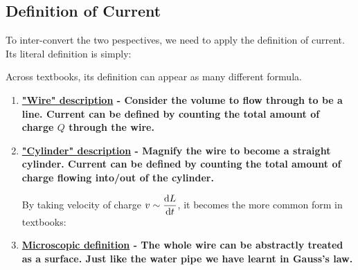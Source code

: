 \documentclass[class=article, crop=false, 12pt]{standalone}
\begin{document}


\subsection{Definition of Current}

To inter-convert the two pespectives, 
we need to apply the definition of current.
Its literal definition is simply:
\begin{center}
\end{center}

Across textbooks, its definition can appear as many different formula.
\begin{enumerate}
    \item \bf{\ul{"Wire" description}} - 
    Consider the volume to flow through to be a line. 
    Current can be defined by counting the total amount of charge $Q$ through the wire. 

    \item \bf{\ul{"Cylinder" description}} - 
    Magnify the wire to become a straight cylinder.
    Current can be defined by counting the total amount of charge 
    flowing into/out of the cylinder. 

    By taking velocity of charge $v\sim\dvv{L}{t}$, it becomes the more common form in textbooks:


    \item \bf{\ul{Microscopic definition}} - The whole wire can be abstractly treated as a surface.
    Just like the water pipe we have learnt in Gauss's law. 


\end{enumerate}
\end{document}
